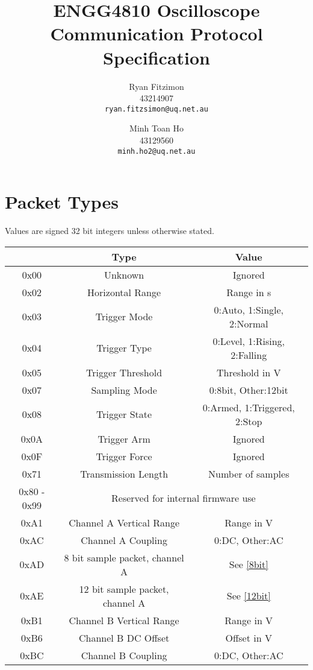 \documentclass[]{article}
\title{ENGG4810 Oscilloscope Communication Protocol Specification}
\author{
	Ryan Fitzimon\\
	43214907\\
	\texttt{ryan.fitzsimon@uq.net.au}
	\and
	Minh Toan Ho\\
	43129560\\
	\texttt{minh.ho2@uq.net.au}
}
\begin{document}
\maketitle

\section{Packet Types}

Values are signed 32 bit integers unless otherwise stated.

\begin{table}[H]
	 
	 
	\renewcommand{\arraystretch}{1.2}
	\centering
	\begin{tabular}{|>{\ttfamily}c|c|c|}
		\hline
		\normalfont{\textbf{Identifier}} & \textbf{Type} & \textbf{Value} \\ \hline
		0x00 & Unknown & Ignored \\ \hline
		0x02 & Horizontal Range & Range in \textmu s \\ \hline
		0x03 & Trigger Mode & 0:Auto, 1:Single, 2:Normal \\ \hline
		0x04 & Trigger Type & 0:Level, 1:Rising, 2:Falling \\ \hline
		0x05 & Trigger Threshold & Threshold in \textmu V \\ \hline
		0x07 & Sampling Mode & 0:8bit, Other:12bit \\ \hline
		0x08 & Trigger State & 0:Armed, 1:Triggered, 2:Stop \\ \hline
		0x0A & Trigger Arm & Ignored \\ \hline 
		0x0F & Trigger Force & Ignored \\ \hline 
		0x71 & Transmission Length & Number of samples \\ \hline
		0x80 - 0x99 & \multicolumn{2}{c|}{Reserved for internal firmware use} \\ \hline
		0xA1 & Channel A Vertical Range & Range in \textmu V \\ \hline
		0xAC & Channel A Coupling & 0:DC, Other:AC \\ \hline
		0xAD & 8 bit sample packet, channel A & See \autoref{8bit} \\ \hline
		0xAE & 12 bit sample packet, channel A & See \autoref{12bit} \\ \hline
		0xB1 & Channel B Vertical Range & Range in \textmu V \\ \hline
		0xB6 & Channel B DC Offset & Offset in \textmu V \\ \hline
		0xBC & Channel B Coupling & 0:DC, Other:AC \\ \hline

\end{tabular}
\end{table}
\end{document}

